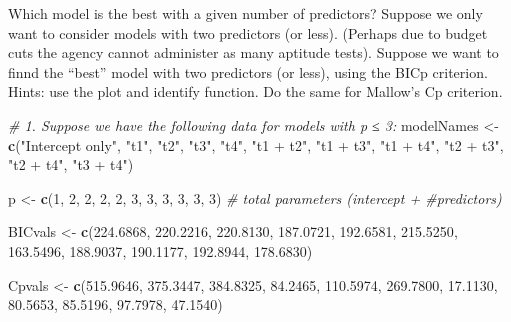 \documentclass[
]{article}
\newenvironment{Shaded}{\begin{snugshade}}{\end{snugshade}}
\newcommand{\CommentTok}[1]{\textcolor[rgb]{0.56,0.35,0.01}{\textit{#1}}}
\newcommand{\DecValTok}[1]{\textcolor[rgb]{0.00,0.00,0.81}{#1}}
\newcommand{\FloatTok}[1]{\textcolor[rgb]{0.00,0.00,0.81}{#1}}
\newcommand{\FunctionTok}[1]{\textcolor[rgb]{0.13,0.29,0.53}{\textbf{#1}}}
\newcommand{\NormalTok}[1]{#1}
\newcommand{\OtherTok}[1]{\textcolor[rgb]{0.56,0.35,0.01}{#1}}
\newcommand{\StringTok}[1]{\textcolor[rgb]{0.31,0.60,0.02}{#1}}
\begin{document}
Which model is the best with a given number of predictors? Suppose we
only want to consider models with two predictors (or less). (Perhaps due
to budget cuts the agency cannot administer as many aptitude tests).
Suppose we want to finnd the ``best'' model with two predictors (or
less), using the BICp criterion. Hints: use the plot and identify
function. Do the same for Mallow's Cp criterion.

\begin{Shaded}
\begin{Highlighting}[]
\CommentTok{\# 1. Suppose we have the following data for models with p ≤ 3:}
\NormalTok{modelNames }\OtherTok{\textless{}{-}} \FunctionTok{c}\NormalTok{(}\StringTok{"Intercept only"}\NormalTok{, }
                \StringTok{"t1"}\NormalTok{, }\StringTok{"t2"}\NormalTok{, }\StringTok{"t3"}\NormalTok{, }\StringTok{"t4"}\NormalTok{,}
                \StringTok{"t1 + t2"}\NormalTok{, }\StringTok{"t1 + t3"}\NormalTok{, }\StringTok{"t1 + t4"}\NormalTok{,}
                \StringTok{"t2 + t3"}\NormalTok{, }\StringTok{"t2 + t4"}\NormalTok{, }\StringTok{"t3 + t4"}\NormalTok{)}

\NormalTok{p }\OtherTok{\textless{}{-}} \FunctionTok{c}\NormalTok{(}\DecValTok{1}\NormalTok{, }\DecValTok{2}\NormalTok{, }\DecValTok{2}\NormalTok{, }\DecValTok{2}\NormalTok{, }\DecValTok{2}\NormalTok{, }\DecValTok{3}\NormalTok{, }\DecValTok{3}\NormalTok{, }\DecValTok{3}\NormalTok{, }\DecValTok{3}\NormalTok{, }\DecValTok{3}\NormalTok{, }\DecValTok{3}\NormalTok{)  }\CommentTok{\# total parameters (intercept + \#predictors)}

\NormalTok{BICvals }\OtherTok{\textless{}{-}} \FunctionTok{c}\NormalTok{(}\FloatTok{224.6868}\NormalTok{, }\FloatTok{220.2216}\NormalTok{, }\FloatTok{220.8130}\NormalTok{, }\FloatTok{187.0721}\NormalTok{, }\FloatTok{192.6581}\NormalTok{,}
             \FloatTok{215.5250}\NormalTok{, }\FloatTok{163.5496}\NormalTok{, }\FloatTok{188.9037}\NormalTok{, }\FloatTok{190.1177}\NormalTok{, }\FloatTok{192.8944}\NormalTok{, }\FloatTok{178.6830}\NormalTok{)}

\NormalTok{Cpvals  }\OtherTok{\textless{}{-}} \FunctionTok{c}\NormalTok{(}\FloatTok{515.9646}\NormalTok{, }\FloatTok{375.3447}\NormalTok{, }\FloatTok{384.8325}\NormalTok{, }\FloatTok{84.2465}\NormalTok{, }\FloatTok{110.5974}\NormalTok{,}
             \FloatTok{269.7800}\NormalTok{, }\FloatTok{17.1130}\NormalTok{, }\FloatTok{80.5653}\NormalTok{, }\FloatTok{85.5196}\NormalTok{, }\FloatTok{97.7978}\NormalTok{, }\FloatTok{47.1540}\NormalTok{)}
\end{Highlighting}
\end{Shaded}
\end{document}
